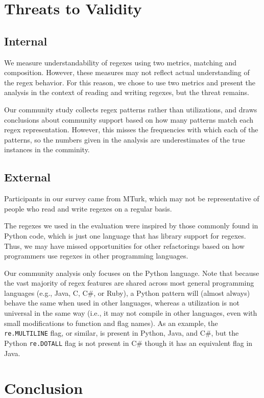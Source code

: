 \section{Threats to Validity}

\subsection{Internal}
We measure understandability of regexes using two metrics, matching and composition. However, these measures may not reflect actual understanding of the regex behavior. For this reason, we chose to use two metrics and present the analysis in the context of reading and writing regexes, but the threat remains. 

Our community study collects regex patterns rather than utilizations, and draws conclusions about community support based on how many patterns match each regex representation. However, this misses the frequencies with which each of the patterns, so the numbers given in the analysis are underestimates of the true instances in the comminity. 


\subsection{External}
Participants in our survey came from MTurk, which may not be representative of people who read and write regexes on a regular basis. 

The regexes we used in the evaluation were inspired by those commonly found in Python code, which is just one language that has library support for regexes. Thus, we may have missed opportunities for other refactorings based on how programmers use regexes in other programming languages. 

Our community analysis only focuses on the Python language. Note that because the vast majority of regex features are shared across most general programming languages (e.g., Java, C, C\#, or Ruby), a Python {pattern} will (almost always) behave the same when used in other languages, whereas a utilization is not universal in the same way (i.e., it may not compile in other languages, even with small modifications to function and flag names).
As an example, the {\tt re.MULTILINE} flag, or similar, is present in Python, Java, and C\#, but  the Python {\tt re.DOTALL} flag is not present in C\# though it has an equivalent flag in Java.

\section{Conclusion}

